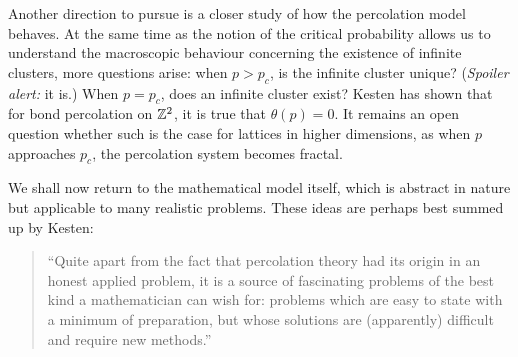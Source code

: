 \documentclass[a4paper, 12pt]{article}
\begin{document}
Another direction to pursue is a closer study of how the percolation model behaves. At the same time as the notion of the critical probability allows us to understand the macroscopic behaviour concerning the existence of infinite clusters, more questions arise: when $p > p_c$, is the infinite cluster unique? (\textit{Spoiler alert:} it is.) When $p = p_c$, does an infinite cluster exist? Kesten \autocite[1]{kesten_1980} has shown that for bond percolation on $\mathbb{Z}^2$, it is true that $\theta(p) = 0$. It remains an open question whether such is the case for lattices in higher dimensions, as when $p$ approaches $p_c$, the percolation system becomes fractal.

We shall now return to the mathematical model itself, which is abstract in nature but applicable to many realistic problems. These ideas are perhaps best summed up by Kesten:

\begin{quotation}
``Quite apart from the fact that percolation theory had its origin in an honest applied problem, it is a source of fascinating problems of the best kind a mathematician can wish for: problems which are easy to state with a minimum of preparation, but whose solutions are (apparently) difficult and require new methods.''
\end{quotation}

\printbibliography
\end{document}
